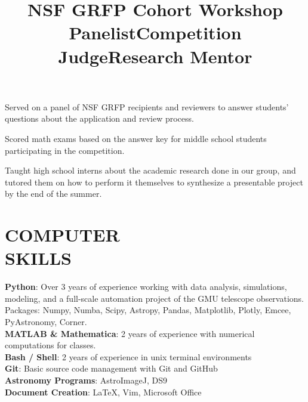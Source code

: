 \documentclass[marg, centered]{res}
\begin{document}
\begin{resume}
\title{\textbf{NSF GRFP Cohort Workshop Panelist}}
\begin{position}
Served on a panel of NSF GRFP recipients and reviewers to answer students' questions about the application and review process.
\end{position}
\vspace{-0.3cm}

\title{\textbf{Competition Judge}}
\begin{position}
Scored math exams based on the answer key for middle school students participating in the competition.
\end{position}

\vspace{-0.3cm}
\title{\textbf{Research Mentor}}
\begin{position}
Taught high school interns about the academic research done in our group, and tutored them on how to perform it themselves to synthesize a presentable project by the end of the summer.
\end{position}


\section{COMPUTER\\SKILLS}

\textbf{Python}: Over 3 years of experience working with data analysis, simulations, modeling, and a full-scale automation project of the GMU telescope observations. Packages: Numpy, Numba, Scipy, Astropy, Pandas, Matplotlib, Plotly, Emcee, PyAstronomy, Corner. \\
\textbf{MATLAB \& Mathematica}: 2 years of experience with numerical computations for classes. \\
\textbf{Bash / Shell}{: 2 years of experience in unix terminal environments} \\
\textbf{Git}{: Basic source code management with Git and GitHub} \\
\textbf{Astronomy Programs}{: AstroImageJ, DS9} \\
\textbf{Document Creation}{: \LaTeX, Vim, Microsoft Office} \\



\end{resume}
\end{document}
